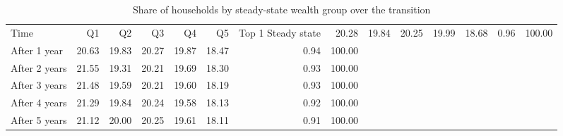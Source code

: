 \begin{table}
\caption{Share of households by steady-state wealth group over the transition}
\label{tab:wealth_group_shares_transition}
\begin{tabular}{lrrrrrrr}
\toprule
Time & Q1 & Q2 & Q3 & Q4 & Q5 & Top 1%
\midrule
Steady state & 20.28 & 19.84 & 20.25 & 19.99 & 18.68 & 0.96 & 100.00 \\
After 1 year & 20.63 & 19.83 & 20.27 & 19.87 & 18.47 & 0.94 & 100.00 \\
After 2 years & 21.55 & 19.31 & 20.21 & 19.69 & 18.30 & 0.93 & 100.00 \\
After 3 years & 21.48 & 19.59 & 20.21 & 19.60 & 18.19 & 0.93 & 100.00 \\
After 4 years & 21.29 & 19.84 & 20.24 & 19.58 & 18.13 & 0.92 & 100.00 \\
After 5 years & 21.12 & 20.00 & 20.25 & 19.61 & 18.11 & 0.91 & 100.00 \\
\bottomrule
\end{tabular}
\end{table}
